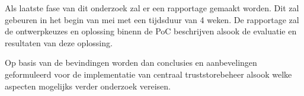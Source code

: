 Als laatste fase van dit onderzoek zal er een rapportage gemaakt worden. Dit zal gebeuren in het begin van mei met een tijdsduur van 4 weken. De rapportage zal de ontwerpkeuzes en oplossing binenn de PoC beschrijven alsook de evaluatie en resultaten van deze oplossing.

Op basis van de bevindingen worden dan conclusies en aanbevelingen geformuleerd voor de implementatie van centraal truststorebeheer alsook welke aspecten mogelijks verder onderzoek vereisen.


